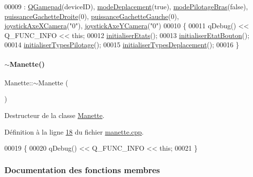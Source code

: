 \begin{DoxyCode}
00009                              : \hyperlink{class_q_gamepad}{QGamepad}(deviceID), \hyperlink{class_manette_a4dc6231c8cc65fac03f59d323fa9a038}{modeDeplacement}(\textcolor{keyword}{true}), 
      \hyperlink{class_manette_acc2cd9afa45328c0da5c580e5c1a67db}{modePilotageBras}(\textcolor{keyword}{false}), \hyperlink{class_manette_a135a3a6f567bbeeefd69b3a020f9f040}{puissanceGachetteDroite}(0), 
      \hyperlink{class_manette_ab777328c9b35454ab45ed5e0b0a5f234}{puissanceGachetteGauche}(0), \hyperlink{class_manette_a0ca05a5c08455e74c8d944b96d8124a6}{joystickAxeXCamera}(\textcolor{stringliteral}{"0"}), 
      \hyperlink{class_manette_ab635d71c9e829d8950b9bbd13b9cdb01}{joystickAxeYCamera}(\textcolor{stringliteral}{"0"})
00010 \{
00011     qDebug() << Q\_FUNC\_INFO << \textcolor{keyword}{this};
00012     \hyperlink{class_manette_afd722561b4cc62304e81a8e41c820bb8}{initialiserEtats}();
00013     \hyperlink{class_manette_a21ebb19837250342e4859ba7dc5f03cc}{initialiserEtatBouton}();
00014     \hyperlink{class_manette_ab20afdb190b24126e54d4f80af0bf310}{initialiserTypesPilotage}();
00015     \hyperlink{class_manette_a9888b04a784ceda912a35b6eb30ae84a}{initialiserTypesDeplacement}();
00016 \}
\end{DoxyCode}
\mbox{\label{class_manette_a86a0cab49599b27d86c2e77f13fa54a2}} 
\paragraph{\texorpdfstring{$\sim$\+Manette()}{~Manette()}}
{\footnotesize\ttfamily Manette\+::$\sim$\+Manette (\begin{DoxyParamCaption}{ }\end{DoxyParamCaption})}



Destructeur de la classe \hyperlink{class_manette}{Manette}. 



Définition à la ligne \hyperlink{manette_8cpp_source_l00018}{18} du fichier \hyperlink{manette_8cpp_source}{manette.\+cpp}.


\begin{DoxyCode}
00019 \{
00020     qDebug() << Q\_FUNC\_INFO << \textcolor{keyword}{this};
00021 \}
\end{DoxyCode}


\subsubsection{Documentation des fonctions membres}
\mbox{\label{class_manette_a37202e63cf8662fed5b3a2efc8eb99d1}} 
